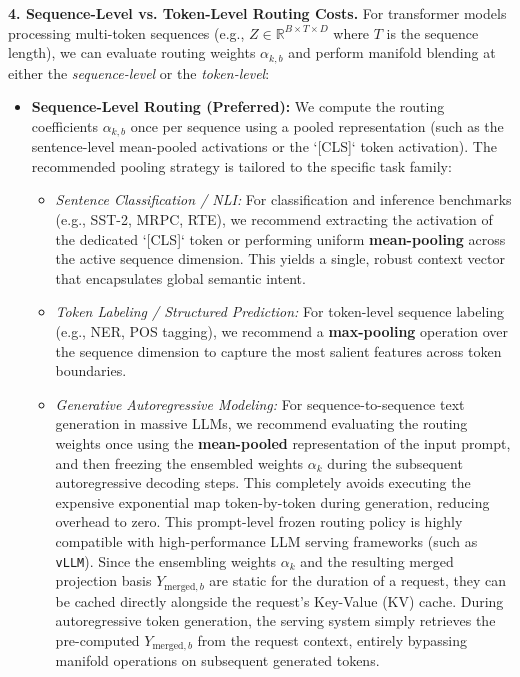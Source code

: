 \textbf{4. Sequence-Level vs. Token-Level Routing Costs.}
For transformer models processing multi-token sequences (e.g., $Z \in \mathbb{R}^{B \times T \times D}$ where $T$ is the sequence length), we can evaluate routing weights $\alpha_{k, b}$ and perform manifold blending at either the \emph{sequence-level} or the \emph{token-level}:
\begin{itemize}
    \item \textbf{Sequence-Level Routing (Preferred):} We compute the routing coefficients $\alpha_{k, b}$ once per sequence using a pooled representation (such as the sentence-level mean-pooled activations or the `[CLS]` token activation). The recommended pooling strategy is tailored to the specific task family:
    \begin{itemize}
        \item \emph{Sentence Classification / NLI:} For classification and inference benchmarks (e.g., SST-2, MRPC, RTE), we recommend extracting the activation of the dedicated `[CLS]` token or performing uniform \textbf{mean-pooling} across the active sequence dimension. This yields a single, robust context vector that encapsulates global semantic intent.
        \item \emph{Token Labeling / Structured Prediction:} For token-level sequence labeling (e.g., NER, POS tagging), we recommend a \textbf{max-pooling} operation over the sequence dimension to capture the most salient features across token boundaries.
        \item \emph{Generative Autoregressive Modeling:} For sequence-to-sequence text generation in massive LLMs, we recommend evaluating the routing weights once using the \textbf{mean-pooled} representation of the input prompt, and then freezing the ensembled weights $\alpha_k$ during the subsequent autoregressive decoding steps. This completely avoids executing the expensive exponential map token-by-token during generation, reducing overhead to zero. This prompt-level frozen routing policy is highly compatible with high-performance LLM serving frameworks (such as \texttt{vLLM}). Since the ensembling weights $\alpha_k$ and the resulting merged projection basis $Y_{\text{merged}, b}$ are static for the duration of a request, they can be cached directly alongside the request's Key-Value (KV) cache. During autoregressive token generation, the serving system simply retrieves the pre-computed $Y_{\text{merged}, b}$ from the request context, entirely bypassing manifold operations on subsequent generated tokens.
    \end{itemize}

\end{itemize}
